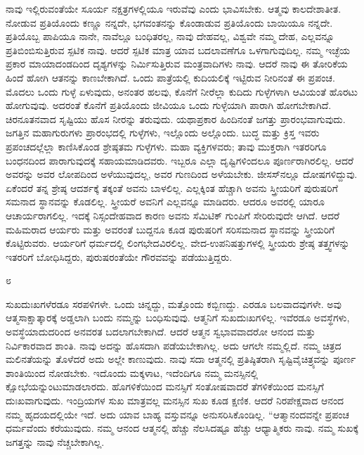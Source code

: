 ನಾವು ಇಲ್ಲಿರುವಂತೆಯೇ ಸೂರ್ಯ ನಕ್ಷತ್ರಗಳಲ್ಲಿಯೂ ಇರುವೆವು ಎಂದು ಭಾವಿಸಬೇಕು. ಆತ್ಮವು ಕಾಲದೇಶಾತೀತ. ನೋಡುವ ಪ್ರತಿಯೊಂದು ಕಣ್ಣೂ ನನ್ನದೇ, ಭಗವಂತನನ್ನು ಕೊಂಡಾಡುವ ಪ್ರತಿಯೊಂದು ಬಾಯಿಯೂ ನನ್ನದೇ. ಪ್ರತಿಯೊಬ್ಬ ಪಾಪಿಯೂ ನಾನೇ, ನಾವೆಲ್ಲೂ ಬಂಧಿತರಲ್ಲ, ನಾವು ದೇಹವಲ್ಲ, ವಿಶ್ವವೇ ನಮ್ಮ ದೇಹ, ಎಲ್ಲವನ್ನೂ ಪ್ರತಿಬಿಂಬಿಸುತ್ತಿರುವ ಸ್ಪಟಿಕ ನಾವು. ಆದರೆ ಸ್ಪಟಿಕ ಮಾತ್ರ ಯಾವ ಬದಲಾವಣೆಗೂ ಒಳಗಾಗುವುದಿಲ್ಲ. ನಮ್ಮ ಇಚ್ಛೆಯ ಪ್ರಕಾರ ಮಾಯಾದಂಡದಿಂದ ದೃಶ್ಯಗಳನ್ನು ನಿರ್ಮಿಸುತ್ತಿರುವ ಮಂತ್ರವಾದಿಗಳು ನಾವು. ಆದರೆ ನಾವು ಈ ತೋರಿಕೆಯ ಹಿಂದೆ ಹೋಗಿ ಆತನನ್ನು ಕಾಣಬೇಕಾಗಿದೆ. ಒಂದು ಪಾತ್ರೆಯಲ್ಲಿ ಕುದಿಯಲಿಕ್ಕೆ ಇಟ್ಟಿರುವ ನೀರಿನಂತೆ ಈ ಪ್ರಪಂಚ. ಮೊದಲು ಒಂದು ಗುಳ್ಳೆ ಏಳುವುದು, ಅನಂತರ ಹಲವು, ಕೊನೆಗೆ ನೀರೆಲ್ಲಾ ಕುದಿದು ಗುಳ್ಳೆಗಳಾಗಿ ಆವಿಯಂತೆ ಹೊರಟು ಹೋಗುವುವು. ಅದರಂತೆ ಕೊನೆಗೆ ಪ್ರತಿಯೊಂದು ಜೀವಿಯೂ ಒಂದು ಗುಳ್ಳೆಯಾಗಿ ಪಾರಾಗಿ ಹೋಗಬೇಕಾಗಿದೆ. ಚಿರನೂತನವಾದ ಸೃಷ್ಟಿಯು ಹೊಸ ನೀರನ್ನು ತರುವುದು. ಯಥಾಪ್ರಕಾರ ಹಿಂದಿನಂತೆ ಜಗತ್ತು ಪ್ರಾರಂಭವಾಗುವುದು. ಜಗತ್ತಿನ ಮಹಾಗುರುಗಳು ಪ್ರಾರಂಭದಲ್ಲಿ ಗುಳ್ಳೆಗಳು, ಇಲ್ಲೊಂದು ಅಲ್ಲೊಂದು. ಬುದ್ಧ ಮತ್ತು ಕ್ರಿಸ್ತ ಇವರು ಪ್ರಪಂಚದಲ್ಲೆಲ್ಲಾ ಕಾಣಿಸಿಕೊಂಡ ಶ್ರೇಷ್ಠತಮ ಗುಳ್ಳೆಗಳು. ಮಹಾ ವ್ಯಕ್ತಿಗಳವರು; ತಾವು ಮುಕ್ತರಾಗಿ ಇತರರಿಗೂ ಬಂಧನದಿಂದ ಪಾರಾಗುವುದಕ್ಕೆ ಸಹಾಯಮಾಡಿದವರು. ಇಬ್ಬರೂ ಎಲ್ಲಾ ದೃಷ್ಟಿಗಳಿಂದಲೂ ಪೂರ್ಣರಾಗಿರಲಿಲ್ಲ. ಆದರೆ ಅವರನ್ನು ಅವರ ಲೋಪದಿಂದ ಅಳೆಯುವುದಲ್ಲ, ಅವರ ಗುಣದಿಂದ ಅಳೆಯಬೇಕು. ಜೀಸಸ್‌ನಲ್ಲೂ ದೋಷಗಳಿದ್ದುವು. ಏಕೆಂದರೆ ತನ್ನ ಶ್ರೇಷ್ಠ ಆದರ್ಶಕ್ಕೆ ತಕ್ಕಂತೆ ಅವನು ಬಾಳಲಿಲ್ಲ. ಎಲ್ಲಕ್ಕಿಂತ ಹೆಚ್ಚಾಗಿ ಅವನು ಸ್ತ್ರೀಯರಿಗೆ ಪುರುಷರಿಗೆ ಸಮನಾದ ಸ್ಥಾನವನ್ನು ಕೊಡಲಿಲ್ಲ. ಸ್ತ್ರೀಯರೆ ಅವನಿಗೆ ಎಲ್ಲವನ್ನೂ ಮಾಡಿದರು. ಆದರೂ ಅವರಲ್ಲಿ ಯಾರೂ ಆಚಾರ್ಯರಾಗಲಿಲ್ಲ. ಇದಕ್ಕೆ ನಿಸ್ಸಂದೇಹವಾದ ಕಾರಣ ಅವನು ಸೆಮಿಟಿಕ್ ಗುಂಪಿಗೆ ಸೇರಿರುವುದೇ ಆಗಿದೆ. ಆದರೆ ಮಹಿಮರಾದ ಆರ್ಯರು ಮತ್ತು ಅವರಂತೆ ಬುದ್ದನೂ ಕೂಡ ಪುರುಷರಿಗೆ ಸರಿಸಮನಾದ ಸ್ಥಾನವನ್ನು ಸ್ತ್ರೀಯರಿಗೆ ಕೊಟ್ಟಿರುವರು. ಆರ್ಯರಿಗೆ ಧರ್ಮದಲ್ಲಿ ಲಿಂಗಭೇದವಿರಲಿಲ್ಲ. ವೇದ-ಉಪನಿಷತ್ತುಗಳಲ್ಲಿ ಸ್ತ್ರೀಯರು ಶ್ರೇಷ್ಠ ತತ್ತ್ವಗಳನ್ನು ಇತರರಿಗೆ ಬೋಧಿಸಿದ್ದರು, ಪುರುಷರಂತೆಯೇ ಗೌರವವನ್ನು ಪಡೆಯುತ್ತಿದ್ದರು.

\begin{center}
೮
\end{center}

ಸುಖದುಃಖಗಳೆರಡೂ ಸರಪಳಿಗಳೇ. ಒಂದು ಚಿನ್ನದ್ದು, ಮತ್ತೊಂದು ಕಬ್ಬಿಣದ್ದು. ಎರಡೂ ಬಲವಾದವುಗಳೇ. ಅವು ಆತ್ಮಸಾಕ್ಷಾತ್ಕಾರಕ್ಕೆ ಅಡ್ಡಲಾಗಿ ಬಂದು ನಮ್ಮನ್ನು ಬಂಧಿಸುವುವು. ಆತ್ಮನಿಗೆ ಸುಖದುಃಖಗಳಿಲ್ಲ. ಇವೆರಡೂ ಅವಸ್ಥೆಗಳು, ಅವಸ್ಥೆಯಾದುದರಿಂದ ಅನವರತ ಬದಲಾಗಬೇಕಾಗಿದೆ. ಆದರೆ ಆತ್ಮನ ಸ್ವಭಾವವಾದರೋ ಆನಂದ ಮತ್ತು ನಿರ್ವಿಕಾರವಾದ ಶಾಂತಿ. ನಾವು ಅದನ್ನು ಹೊಸದಾಗಿ ಪಡೆಯಬೇಕಾಗಿಲ್ಲ. ಅದು ಆಗಲೇ ನಮ್ಮಲ್ಲಿದೆ. ನಮ್ಮ ಚಿತ್ರದ ಮಲಿನತೆಯನ್ನು ತೊಳೆದರೆ ಅದು ಅಲ್ಲೇ ಕಾಣುವುದು. ನಾವು ಸದಾ ಆತ್ಮನಲ್ಲಿ ಪ್ರತಿಷ್ಠಿತರಾಗಿ ಸೃಷ್ಟಿವೈಚಿತ್ರ್ಯವನ್ನು ಪೂರ್ಣ ಶಾಂತಿಯಿಂದ ನೋಡಬೇಕು. ಇದೊಂದು ಮಕ್ಕಳಾಟ, ಇದೆಂದಿಗೂ ನಮ್ಮ ಮನಸ್ಸಿನಲ್ಲಿ ಕ್ಷೋಭೆಯನ್ನುಂಟುಮಾಡಲಾರದು. ಹೊಗಳಿಕೆಯಿಂದ ಮನಸ್ಸಿಗೆ ಸಂತೋಷವಾದರೆ ತೆಗಳಿಕೆಯಿಂದ ಮನಸ್ಸಿಗೆ ದುಃಖವಾಗುವುದು. ಇಂದ್ರಿಯಗಳ ಸುಖ ಮಾತ್ರವಲ್ಲ ಮನಸ್ಸಿನ ಸುಖ ಕೂಡ ಕ್ಷಣಿಕ. ಆದರೆ ನಿರಪೇಕ್ಷವಾದ ಆನಂದ ನಮ್ಮ ಹೃದಯದಲ್ಲಿಯೇ ಇದೆ. ಅದು ಯಾವ ಬಾಹ್ಯ ವಸ್ತುವನ್ನೂ ಅನುಸರಿಸಿಕೊಂಡಿಲ್ಲ. “ಆತ್ಮಾನಂದವನ್ನೇ ಪ್ರಪಂಚ ಧರ್ಮವೆಂದು ಕರೆಯುವುದು. ನಮ್ಮ ಆನಂದ ಆತ್ಮನಲ್ಲಿ ಹೆಚ್ಚು ನೆಲಸಿದಷ್ಟೂ ಹೆಚ್ಚು ಆಧ್ಯಾತ್ಮಿಕರು ನಾವು. ನಮ್ಮ ಸುಖಕ್ಕೆ ಜಗತ್ತನ್ನು ನಾವು ನೆಚ್ಚಬೇಕಾಗಿಲ್ಲ.

